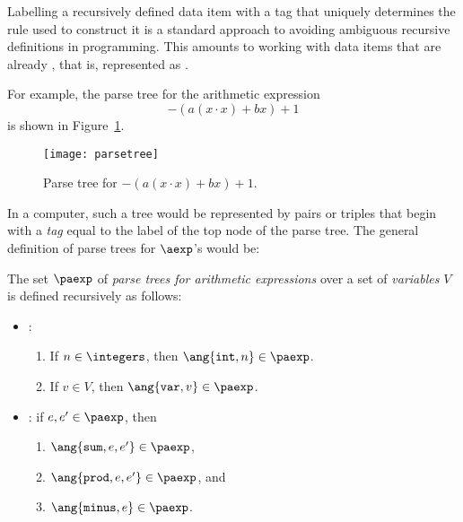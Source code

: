 \begin{definition}
\begin{editingnotes}
Labelling a recursively defined data item with a tag that uniquely
determines the rule used to construct it is a standard approach to
avoiding ambiguous recursive definitions in programming.  This
amounts to working with data items that are already , that
is, represented as .

For example, the parse tree for the arithmetic expression
\begin{equation}\label{ax}
-(a(x\cdot x)+ bx) + 1
\end{equation}
is shown in Figure~\ref{fig:parse}.

\begin{figure}
\texttt{[image: parsetree]}
\caption{Parse tree for $-(a(x\cdot x)+ bx) + 1$.}
\label{fig:parse}
\end{figure}

In a computer, such a tree would be represented by pairs or triples
that begin with a
\emph{tag} equal to the label of the top node of the parse tree.  
The general definition of parse trees for $\aexp$'s would be:


\begin{definition}\label{arithparse}
The set $\paexp$ of \emph{parse trees for arithmetic expressions} 
over a set of
\emph{variables} $V$ is defined recursively as follows:
\begin{itemize}
\item {}:
\begin{enumerate}
\item If $n \in \integers$, then $\ang{\texttt{int}, n} \in \paexp$.
\item If $v \in V$, then $\ang{\texttt{var}, v} \in \paexp$.
\end{enumerate}
\item {}: if $e,e' \in \paexp$, then
\begin{enumerate}
\item $\ang{\texttt{sum}, e, e'} \in \paexp$,
\item $\ang{\texttt{prod}, e, e'} \in \paexp$, and
\item $\ang{\texttt{minus}, e} \in \paexp$.
\end{enumerate}
\end{itemize}
\end{definition}


\end{editingnotes}
\end{definition}
